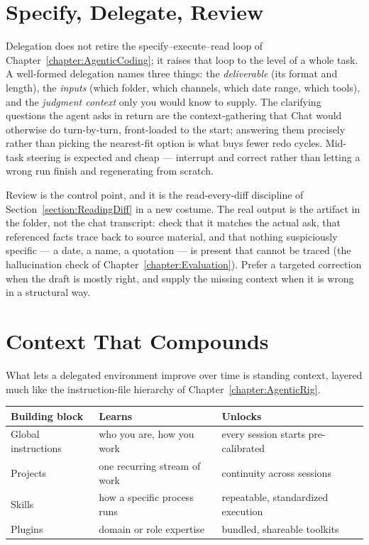 \section{Specify, Delegate, Review}

Delegation does not retire the specify--execute--read loop of Chapter~\ref{chapter:AgenticCoding}; it raises that loop to the level of a whole task.
A well-formed delegation names three things: the \emph{deliverable} (its format and length), the \emph{inputs} (which folder, which channels, which date range, which tools), and the \emph{judgment context} only you would know to supply.
The clarifying questions the agent asks in return are the context-gathering that Chat would otherwise do turn-by-turn, front-loaded to the start; answering them precisely rather than picking the nearest-fit option is what buys fewer redo cycles.
Mid-task steering is expected and cheap --- interrupt and correct rather than letting a wrong run finish and regenerating from scratch.

Review is the control point, and it is the read-every-diff discipline of Section~\ref{section:ReadingDiff} in a new costume.
The real output is the artifact in the folder, not the chat transcript: check that it matches the actual ask, that referenced facts trace back to source material, and that nothing suspiciously specific --- a date, a name, a quotation --- is present that cannot be traced (the hallucination check of Chapter~\ref{chapter:Evaluation}).
Prefer a targeted correction when the draft is mostly right, and supply the missing context when it is wrong in a structural way.

\section{Context That Compounds}

What lets a delegated environment improve over time is standing context, layered much like the instruction-file hierarchy of Chapter~\ref{chapter:AgenticRig}.

\begin{center}
\small
\begin{tabular}{@{}lll@{}}
\toprule
Building block & Learns & Unlocks \\
\midrule
Global instructions & who you are, how you work   & every session starts pre-calibrated \\
Projects            & one recurring stream of work & continuity across sessions \\
Skills              & how a specific process runs  & repeatable, standardized execution \\
Plugins             & domain or role expertise     & bundled, shareable toolkits \\
\bottomrule
\end{tabular}
\end{center}

